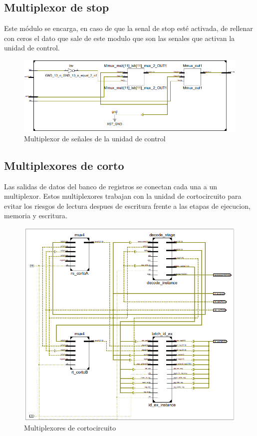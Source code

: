 \subsection{Multiplexor de stop}
Este m\'odulo se encarga, en caso de que la senal de stop est\'e activada, de rellenar con ceros el dato que sale de este modulo que son las senales que activan la unidad de control.

\begin{figure}[H]
\centering
\includegraphics[scale=0.5]{img/multiplexor_inside}
\caption{Multiplexor de señales de la unidad de control}
\label{fig:sign_extended}
\end{figure}

\subsection{Multiplexores de corto}
Las salidas de datos del banco de registros se conectan cada una a un multiplexor. Estos multiplexores trabajan con la unidad de cortocircuito para evitar los riesgos de lectura despues de escritura frente a las etapas de ejecucion, memoria y escritura.

\begin{figure}[H]
\centering
\includegraphics[scale=0.5]{img/cortos}
\caption{Multiplexores de cortocircuito}
\label{fig:corto}
\end{figure}
